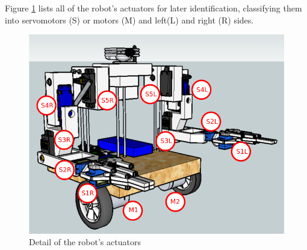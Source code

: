 Figure \ref{ass31} lists all of the robot's actuators for later identification, classifying them into servomotors (S) or motors (M) and left(L) and right (R) sides.\\

\begin{figure}[H]
			\centering
			\includegraphics[scale=0.45]{images/Assembly/34-2.png}
			\caption{Detail of the robot's actuators }
			\label{ass31}
	\end{figure}
	\bigskip


















































































